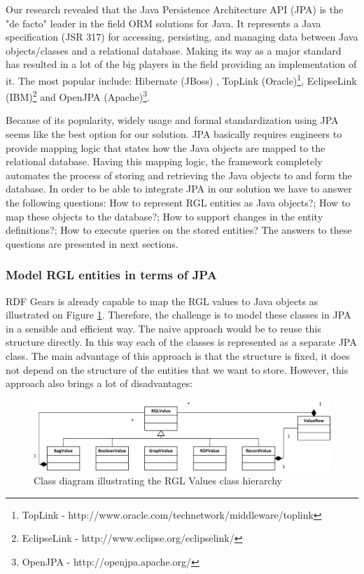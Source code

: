Our research revealed that the Java Persistence Architecture API (JPA) is the "de facto" leader in the field ORM solutions for Java. It represents a Java specification (JSR 317) for accessing, persisting, and managing data between Java objects/classes and a relational database. Making its way as a major standard has resulted in a lot of the big players in the field providing an implementation of it. The most popular include: Hibernate (JBoss) \cite{linwood2010beginning}, TopLink (Oracle)\footnote{TopLink - http://www.oracle.com/technetwork/middleware/toplink}, EclipseLink (IBM)\footnote{EclipseLink - http://www.eclipse.org/eclipselink/} and OpenJPA (Apache)\footnote{OpenJPA - http://openjpa.apache.org/}. 

Because of its popularity, widely usage and formal standardization using JPA seems like the best option for our solution. JPA basically requires engineers to provide mapping logic that states how the Java objects are mapped to the relational database. Having this mapping logic, the framework completely automates the process of storing and retrieving the Java objects to and form the database. In order to be able to integrate JPA in our solution we have to answer the following questions: How to represent RGL entities as Java objects?; How to map these objects to the database?; How to support changes in the entity definitions?; How to execute queries on the stored entities? The answers to these questions are presented in next sections.


\subsubsection{Model RGL entities in terms of JPA}

RDF Gears is already capable to map the RGL values to Java objects as illustrated on Figure \ref{fig_rglValuesClassDiag}. Therefore, the challenge is to model these classes in JPA in a sensible and efficient way. The naive approach would be to reuse this structure directly. In this way each of the classes is represented as a separate JPA class. The main advantage of this approach is that the structure is fixed, it does not depend on the structure of the entities that we want to store. However, this approach also brings a lot of disadvantages: 

\begin{figure}[h!]
  \centering
  	\includegraphics[scale=0.8]{storage/diagrams/RGLValues.png}
  \caption{Class diagram illustrating the RGL Values class hierarchy}
  \label{fig_rglValuesClassDiag}
\end{figure}


